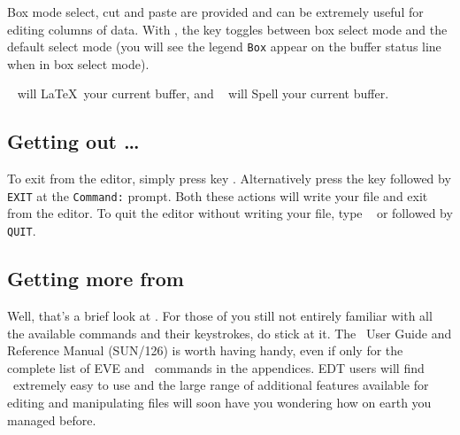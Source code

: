 Box mode select, cut and paste are provided and can be extremely useful for
editing columns of data. With \STEve, the  key toggles between box
select mode and the default select mode (you will see the legend {\tt Box}
appear on the buffer status line when in box select mode).

\  will \LaTeX\ your current buffer, and \gold\ 
 will Spell your current buffer.

\subsection*{Getting out \ldots}
To exit from the editor, simply press key . Alternatively press
the \keyname{Do} key followed by {\tt EXIT} at the {\tt Command:} prompt. Both
these actions will write your file and exit from the editor. To quit the editor
without writing your file, type \gold\ \keyname{Q} or \keyname{Do} followed 
by {\tt QUIT}.

\subsection*{Getting more from \STEve}
Well, that's a brief look at \STEve. For those of you still not entirely
familiar with all the available commands and their keystrokes, do stick at it.
The \STEve\ User Guide and Reference Manual (SUN/126) is worth having handy,
even if only for the complete list of EVE and \STEve\ commands in the
appendices. EDT users will find \STEve\ extremely easy to use and the large
range of additional features available for editing and manipulating files will
soon have you wondering how on earth you managed before.


